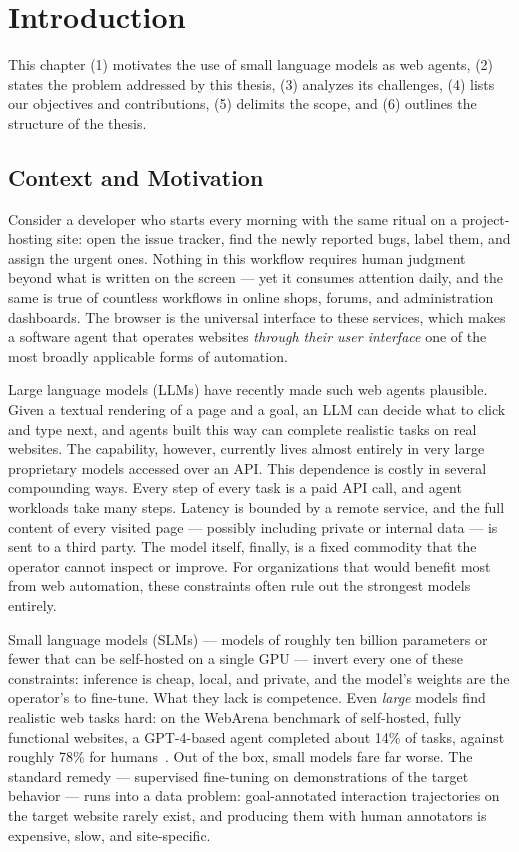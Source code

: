 \chapter{Introduction}
\label{ch:intro}

This chapter (1) motivates the use of small language models as web agents,
(2) states the problem addressed by this thesis, (3) analyzes its challenges,
(4) lists our objectives and contributions, (5) delimits the scope, and
(6) outlines the structure of the thesis.

\section{Context and Motivation}
\label{sec:intro-context}

Consider a developer who starts every morning with the same ritual on a
project-hosting site: open the issue tracker, find the newly reported bugs,
label them, and assign the urgent ones. Nothing in this workflow requires
human judgment beyond what is written on the screen --- yet it consumes
attention daily, and the same is true of countless workflows in online
shops, forums, and administration dashboards. The browser is the universal
interface to these services, which makes a software agent that operates
websites \emph{through their user interface} one of the most broadly
applicable forms of automation.

Large language models (LLMs) have recently made such web agents plausible.
Given a textual rendering of a page and a goal, an LLM can decide what to
click and type next, and agents built this way can complete realistic tasks
on real websites. The capability, however, currently lives almost entirely
in very large proprietary models accessed over an API. This dependence is
costly in several compounding ways. Every step of every task is a paid API
call, and agent workloads take many steps. Latency is bounded by a remote
service, and the full content of every visited page --- possibly including
private or internal data --- is sent to a third party. The model itself,
finally, is a fixed commodity that the operator cannot inspect or improve. For
organizations that would benefit most from web automation, these constraints
often rule out the strongest models entirely.

Small language models (SLMs) --- models of roughly ten billion parameters or
fewer that can be self-hosted on a single GPU --- invert every one of these
constraints: inference is cheap, local, and private, and the model's weights
are the operator's to fine-tune. What they lack is competence. Even
\emph{large} models find realistic web tasks hard: on the WebArena benchmark
of self-hosted, fully functional websites, a GPT-4-based agent completed
about 14\% of tasks, against roughly 78\% for humans~\cite{zhou2024webarena}.
Out of the box, small models fare far worse. The standard remedy ---
supervised fine-tuning on demonstrations of the target behavior --- runs
into a data problem: goal-annotated interaction trajectories on the target
website rarely exist, and producing them with human annotators is expensive,
slow, and site-specific.

